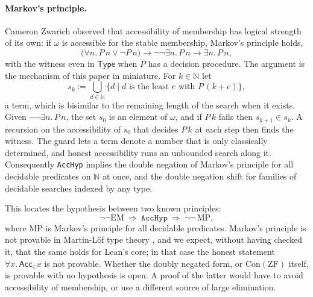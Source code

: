 \documentclass[10pt]{article}
\theoremstyle{definition}
\theoremstyle{remark}
\newcommand{\N}{\mathbb{N}}
\newcommand{\Type}{\mathsf{Type}}
\newcommand{\ZF}{\mathrm{ZF}}
\newcommand{\EM}{\mathrm{EM}}
\newcommand{\Con}{\mathrm{Con}}
\newcommand{\Acc}{\mathsf{Acc}}
\newcommand{\lean}[1]{\texttt{#1}}
\newcommand{\guard}[2]{\{#1\mid #2\}}
\begin{document}
\paragraph{Markov's principle.}
Cameron Zwarich observed \cite{zwarich26} that accessibility of
membership has logical strength of its own: if $\omega$ is accessible for
the stable membership, Markov's principle holds,
\[\bigl(\forall n.\,P\,n\vee\neg P\,n\bigr)\to\neg\neg\exists n.\,P\,n\to\exists n.\,P\,n,\]
with the witness even in $\Type$ when $P$ has a decision procedure. The
argument is the mechanism of this paper in miniature. For $k\in\N$ let
\[s_k:=\textstyle\bigcup_{d\in\N}\guard{d}{\text{$d$ is the least $e$ with $P\,(k+e)$}},\]
a term, which is bisimilar to the remaining length of the search when it
exists. Given $\neg\neg\exists n.\,P\,n$, the set $s_0$ is an element of $\omega$, and if
$P\,k$ fails then $s_{k+1}\in s_k$. A recursion on the accessibility of
$s_0$ that decides $P\,k$ at each step then finds the witness. The guard
lets a term denote a number that is only classically determined, and
honest accessibility runs an unbounded search along it. Consequently
\lean{AccHyp} implies the double negation of Markov's principle for all
decidable predicates on $\N$ at once, and the double negation shift for
families of decidable searches indexed by any type.

This locates the hypothesis between two known principles:
\[\neg\neg\EM\ \Longrightarrow\ \lean{AccHyp}\ \Longrightarrow\ \neg\neg\,\mathrm{MP},\]
where $\mathrm{MP}$ is Markov's principle for all decidable predicates. Markov's
principle is not provable in Martin-L\"of type theory
\cite{coquandmannaa16}, and we expect, without having checked it, that
the same holds for Lean's core; in that case the honest statement
$\forall x.\,\Acc_\in x$ is not provable. Whether the doubly negated form, or
$\Con(\ZF)$ itself, is provable with no hypothesis is open. A proof of the
latter would have to avoid accessibility of membership, or use a
different source of large elimination.
\end{document}
